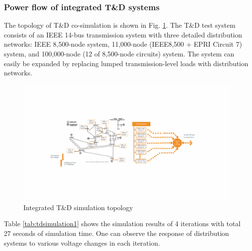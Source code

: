 \documentclass{article}
\begin{document}
\subsubsection{Power flow of integrated T\&D systems}
The topology of T\&D co-simulation is shown in Fig. \ref{fig:tdsimulation}. The T\&D test system consists of an IEEE 14-bus transmission system with three detailed distribution networks: IEEE 8,500-node system, 11,000-node (IEEE8,500 + EPRI Circuit 7) system, and 100,000-node (12 of 8,500-node circuits) system. The system can easily be expanded by replacing lumped transmission-level loads with distribution networks.\par

\begin{figure}[h]
    \centering
    \includegraphics[width=1.0\linewidth]{pics/tdsimulation.pdf}
    \caption{Integrated T\&D simulation topology}
    \label{fig:tdsimulation}
\end{figure}

Table \ref{tab:tdsimulation1} shows the simulation results of 4 iterations with total 27 seconds of simulation time. One can observe the response of distribution systems to various voltage changes in each iteration. \par
\end{document}
